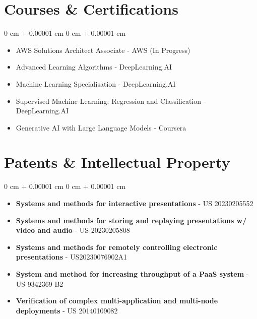 \documentclass[10pt, letterpaper]{article}
\newenvironment{highlights}{
    \begin{itemize}[
        topsep=0.10 cm,
        parsep=0.10 cm,
        partopsep=0pt,
        itemsep=0pt,
        leftmargin=0 cm + 10pt
    ]
}{
    \end{itemize}
} %
\newenvironment{onecolentry}{
    \begin{adjustwidth}{
        0 cm + 0.00001 cm
    }{
        0 cm + 0.00001 cm
    }
}{
    \end{adjustwidth}
} %
\begin{document}
        \section{Courses \& Certifications}
        \vspace{0.10 cm}
        \begin{onecolentry}
            \begin{highlights}
                \item AWS Solutions Architect Associate - AWS (In Progress)
                \item Advanced Learning Algorithms - DeepLearning.AI
                \item Machine Learning Specialisation - DeepLearning.AI
                \item Supervised Machine Learning: Regression and Classification - DeepLearning.AI
                \item Generative AI with Large Language Models - Coursera
            \end{highlights}
        \end{onecolentry}

        \section{Patents \& Intellectual Property}
        \vspace{0.10 cm}
        \begin{onecolentry}
            \begin{highlights}
                \item \textbf{Systems and methods for interactive presentations} - US 20230205552
                \item \textbf{Systems and methods for storing and replaying presentations w/ video and audio} - US 20230205808
                \item \textbf{Systems and methods for remotely controlling electronic presentations} - US20230076902A1
                \item \textbf{System and method for increasing throughput of a PaaS system} - US 9342369 B2
                \item \textbf{Verification of complex multi-application and multi-node deployments} - US 20140109082
            \end{highlights}
        \end{onecolentry}
        
\end{document}
